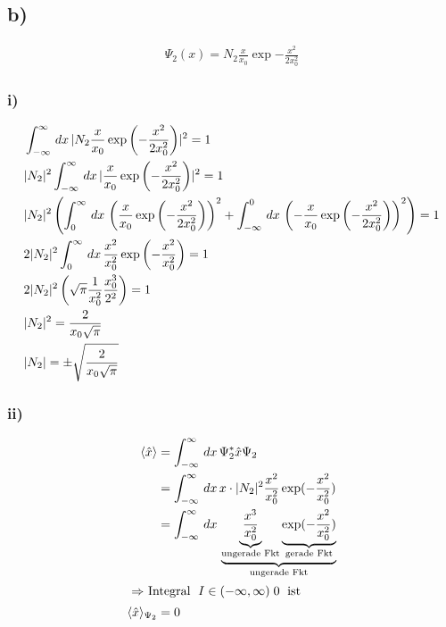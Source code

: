 \subsection{b)}

\begin{align}
    \Psi_2 (x)=N_2 \frac{x}{x_0} \exp{-\frac{x^2}{2x_0^2}}
\end{align}

\subsubsection{i)}

\begin{align}
    &\int_{-\infty}^{\infty}\,dx\, \lvert N_2\frac{x}{x_0}\exp\left(-\frac{x^2}{2x_0^2}\right)\rvert^2=1\\
    &\lvert N_2\rvert^2 \int_{-\infty}^{\infty}\,dx\, \lvert\frac{x}{x_0}\exp\left(-\frac{x^2}{2x_0^2}\right)\rvert^2=1\\
    &\lvert N_2\rvert^2 \left(\int_0^{\infty}\,dx\,\left(\frac{x}{x_0}\exp\left(-\frac{x^2}{2x_0^2}\right)\right)^2+ \int_{-\infty}^0\,dx\,\left(-\frac{x}{x_0} \exp\left(-\frac{x^2}{2x_0^2}\right)\right)^2 \right)=1\\
    &2 \lvert N_2\rvert^2 \int_0^{\infty}\,dx\, \frac{x^2}{x_0^2} \exp\left(-\frac{x^2}{x_0^2}\right)=1\\
    &2 \lvert N_2\rvert^2 \left(\sqrt{\pi} \frac{1}{x_0^2} \frac{x_0^3}{2^2}\right)=1\\
    &\lvert N_2\rvert^2=\frac{2}{x_0\sqrt{\pi}}\\
    &\lvert N_2\rvert= \pm \sqrt{\frac{2}{x_0\sqrt{\pi}}}
\end{align}

\subsubsection{ii)}

\begin{align}
    \langle\hat x \rangle &= \int_{-\infty}^{\infty}\,dx\, \Psi _2^* \hat x \Psi _2\\
    &= \int_{-\infty}^{\infty}\,dx\, x\cdot  \lvert N_2\rvert^2 \frac{x^2}{x_0^2}\exp(-\frac{x^2}{x_0^2})\\
    &=\int_{-\infty}^{\infty}\,dx\, \underbrace{\underbrace{\frac{x^3}{x_0^2}}_{\text{ungerade Fkt}} \underbrace{\exp(-\frac{x^2}{x_0^2})}_{\text{gerade Fkt}}}_{\text{ungerade Fkt}}\\
    \intertext{
        $\Rightarrow $ Integral $\;I \in (-\infty,\infty) \; 0\; $ ist
    }
    \langle\hat x \rangle_{\Psi_2}&=0
\end{align}

